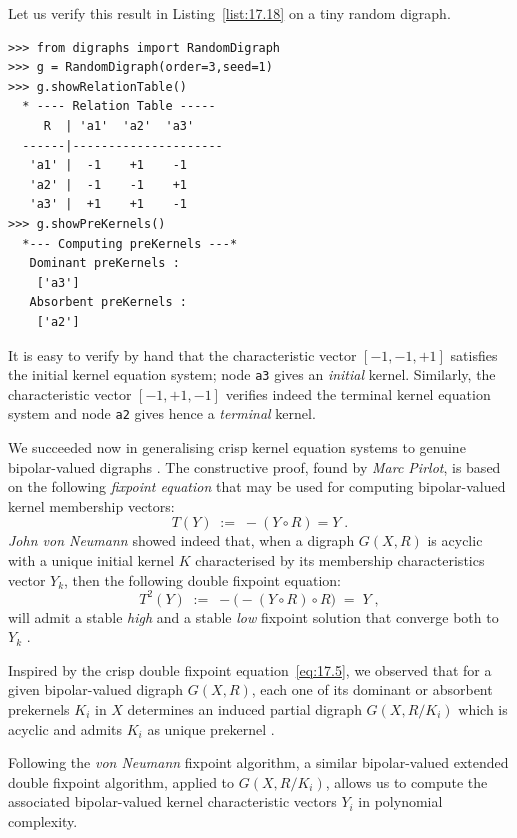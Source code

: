 Let us verify this result in Listing~\vref{list:17.18} on a tiny random digraph.
\begin{lstlisting}[caption={Verifying the kernel equation system on a tiny random digraph},label=list:17.18]
>>> from digraphs import RandomDigraph
>>> g = RandomDigraph(order=3,seed=1)
>>> g.showRelationTable()
  * ---- Relation Table -----
     R  | 'a1'  'a2'  'a3'	  
  ------|---------------------
   'a1' |  -1    +1    -1	 
   'a2' |  -1    -1    +1	 
   'a3' |  +1    +1    -1	 
>>> g.showPreKernels()
  *--- Computing preKernels ---*
   Dominant preKernels :
    ['a3']
   Absorbent preKernels :
    ['a2']
\end{lstlisting}

It is easy to verify by hand that the characteristic vector $[-1, -1, +1]$ satisfies the initial kernel equation system; node \texttt{a3} gives an \emph{initial} kernel. Similarly, the characteristic vector $[-1, +1, -1]$ verifies indeed the terminal kernel equation system and node \texttt{a2} gives hence a \emph{terminal} kernel.

We succeeded now in generalising crisp kernel equation systems to genuine bipolar-valued digraphs \citep*{BIS-2006a,BIS-2006b}. The constructive proof, found by \emph{Marc Pirlot}, is based on the following \emph{fixpoint equation} that may be used for computing bipolar-valued kernel membership vectors:
\begin{equation}\label{eq:17.4}
T(Y) \; := \; -(Y \circ R) = Y\;.
\end{equation}
\emph{John von Neumann} showed indeed that, when a digraph $G(X,R)$ is acyclic with a unique initial kernel $K$ characterised by its membership characteristics vector $Y_k$, then the following double fixpoint equation:
\begin{equation}\label{eq:17.5}
T^2(Y) \; := \; -\big( -(Y \circ R) \circ R) \; = \; Y\;,
\end{equation}
will admit a stable \emph{high} and a stable \emph{low} fixpoint solution that converge both to $Y_k$ \citep{SCH-1985}.

Inspired by the crisp double fixpoint equation~\vref{eq:17.5}, we observed that for a given bipolar-valued digraph $G(X,R)$, each one of its dominant or absorbent prekernels $K_i$ in $X$ determines an induced partial digraph $G(X,R/K_i)$ which is acyclic and admits $K_i$ as unique prekernel \citep{BIS-2006b}.

Following the \emph{von Neumann} fixpoint algorithm, a similar bipolar-valued extended double fixpoint algorithm, applied to $G(X,R/K_i)$, allows us to compute the associated bipolar-valued kernel characteristic vectors $Y_i$ in polynomial complexity.

